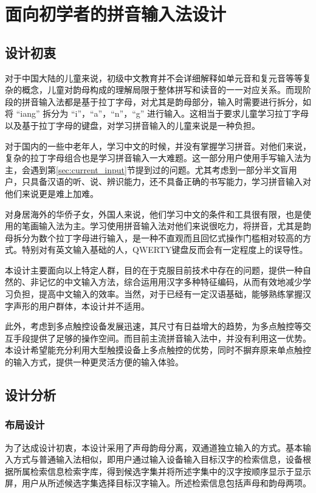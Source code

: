 \chapter{面向初学者的拼音输入法设计}
  \section{设计初衷}

  对于中国大陆的儿童来说，初级中文教育并不会详细解释如单元音和复元音等等复杂的概念，儿童对韵母构成的理解局限于整体拼写和读音的一一对应关系。而现阶段的拼音输入法都是基于拉丁字母，对尤其是韵母部分，输入时需要进行拆分，如将 “iang” 拆分为 “i”，“a”，“n”，“g” 进行输入。这相当于要求儿童学习拉丁字母以及基于拉丁字母的键盘，对学习拼音输入的儿童来说是一种负担。

  对于国内的一些中老年人，学习中文的时候，并没有掌握学习拼音。对他们来说，复杂的拉丁字母组合也是学习拼音输入一大难题。这一部分用户使用手写输入法为主，会遇到第\ref{sec:current_input}节提到过的问题。尤其考虑到一部分半文盲用户，只具备汉语的听、说、辨识能力，还不具备正确的书写能力，学习拼音输入对他们来说更是难上加难。

  对身居海外的华侨子女，外国人来说，他们学习中文的条件和工具很有限，也是使用的笔画输入法为主。学习使用拼音输入法对他们来说很吃力，将拼音，尤其是韵母拆分为数个拉丁字母进行输入，是一种不直观而且回忆式操作门槛相对较高的方式。特别对有英文输入基础的人，QWERTY键盘反而会有一定程度上的误导性。

  本设计主要面向以上特定人群，⽬的在于克服目前技术中存在的问题，提供⼀种自然的、⾮记忆的中⽂输⼊方法，综合运⽤用汉字多种特征编码，从⽽有效地减少学习负担，提高中⽂输入的效率。当然，对于已经有一定汉语基础，能够熟练掌握汉字声形的用户群体，本设计并不适用。

  此外，考虑到多点触控设备发展迅速，其尺寸有日益增大的趋势，为多点触控等交互手段提供了足够的操作空间。而目前主流拼音输入法中，并没有利用这一优势。本设计希望能充分利用大型触摸设备上多点触控的优势，同时不摒弃原来单点触控的输入方式，提供一种更灵活方便的输入体验。

  \section{设计分析}
  \subsection{布局设计}

  为了达成设计初衷，本设计采用了声母韵母分离，双通道独立输入的方式。基本输入方式与普通输入法相似，即用户通过输入设备输入目标汉字的检索信息，设备根据所属检索信息检索字库，得到候选字集并将所述字集中的汉字按顺序显示于显示屏，用户从所述候选字集选择目标汉字输入。所述检索信息包括声母和韵母两项。

